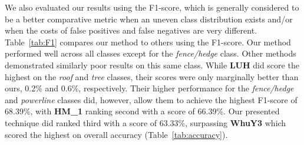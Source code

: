 \documentclass[final,3p,times,twocolumn,authoryear]{elsarticle}
\begin{document}
We also evaluated our results using the F1-score, which is generally considered to be a better comparative metric when an uneven class distribution exists and/or when the costs of false positives and false negatives are very different.
Table~\ref{tab:F1} compares our method to others using the F1-score. Our method performed well across all classes except for the {\it fence/hedge} class. Other methods demonstrated similarly poor results on this same class. While {\bf LUH} did score the highest on the {\it roof} and {\it tree} classes, their scores were only marginally better than ours, 0.2\% and 0.6\%, respectively. Their higher performance for the {\it fence/hedge} and {\it powerline} classes did, however, allow them to achieve the highest F1-score of 68.39\%, with {\bf HM\_1} ranking second with a score of 66.39\%. Our presented technique did ranked third with a score of 63.33\%, surpassing {\bf WhuY3} which scored the highest on overall accuracy (Table~\ref{tab:accuracy}).
\end{document}

